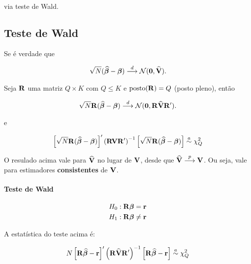 \documentclass[11pt, oneside, a4paper, article]{article}
\numberwithin{equation}{section}
\begin{document}
\noindent
via teste de Wald.

\subsection{Teste de Wald}

Se é verdade que

\vspace{-1 em}
\begin{align*}
	\sqrt{N} (\widehat{\boldsymbol{\beta}} - \boldsymbol{\beta}) 
	 \overset{d}{\longrightarrow} 
	\mathcal{N}(\boldsymbol{0}, \widehat{\mathbf{V}}).
\end{align*}

\noindent
Seja $\mathbf{R}$ uma matriz $Q \times K$ com $Q \leq K$ e $\text{posto}(\mathbf{R}) = Q$ (posto pleno), então

\vspace{-1 em}
\begin{align*}
	\sqrt{N} \mathbf{R} (\widehat{\boldsymbol{\beta}} - \boldsymbol{\beta}) 
	 \overset{d}{\longrightarrow} 
	\mathcal{N}(\boldsymbol{0}, \mathbf{R} \widehat{\mathbf{V}} \mathbf{R}').
\end{align*}

e

\vspace{-1 em}
\begin{align*}
	\left[ \sqrt{N} \mathbf{R} (\widehat{\boldsymbol{\beta}} - \boldsymbol{\beta})  \right]'
	\left( \mathbf{R} \mathbf{V} \mathbf{R}' \right)^{-1}
	\left[ \sqrt{N} \mathbf{R} (\widehat{\boldsymbol{\beta}} - \boldsymbol{\beta})  \right]
	\overset{a}{\sim}
	\chi^{2}_{Q} 
\end{align*}

O resulado acima vale para $\widehat{\mathbf{V}}$ no lugar de $\mathbf{V}$, desde que $\widehat{\mathbf{V}}  \overset{p}{\longrightarrow}  \mathbf{V}$.
Ou seja, vale para estimadores \textbf{consistentes} de $\mathbf{V}$.

\paragraph{Teste de Wald}

\begin{align*}
	H_{0} &: \mathbf{R} \boldsymbol{\beta} = \mathbf{r}
	\\
	H_{1} &: \mathbf{R} \boldsymbol{\beta} \neq \mathbf{r}
\end{align*}

A estatística do teste acima é:

\vspace{-1 em}
\begin{align*}
	N
	\left[ \mathbf{R} \widehat{\boldsymbol{\beta}} - \mathbf{r}  \right]'
	\left( \mathbf{R} \widehat{\mathbf{V}} \mathbf{R}' \right)^{-1}
	\left[ \mathbf{R} \widehat{\boldsymbol{\beta}} - \mathbf{r}  \right]
	\overset{a}{\sim}
	\chi^{2}_{Q} 
\end{align*}
\end{document}
